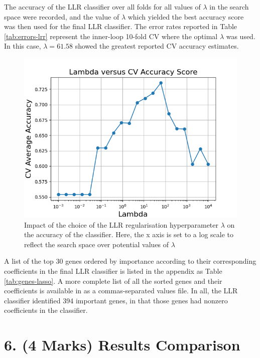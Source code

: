 \documentclass[twocolumn]{article}
\begin{document}
The accuracy of the LLR classifier over all folds for all values of $\lambda$ in the search space were recorded, and the value of $\lambda$ which yielded the best accuracy score was then used for the final LLR classifier. The error rates reported in Table \ref{tab:errors-lrr} represent the inner-loop 10-fold CV where the optimal $\lambda$ was used. In this case, $\lambda=61.58$ showed the greatest reported CV accuracy estimates.

\begin{figure}[H]
    \centering
    \includegraphics[width=\linewidth]{figures/Lambda_versus_CV_Accuracy_Score.png}
    \caption{Impact of the choice of the LLR regularisation hyperparameter $\lambda$ on the accuracy of the classifier. Here, the x axis is set to a log scale to reflect the search space over potential values of $\lambda$}
    \label{fig:lambda-search}
\end{figure}

A list of the top 30 genes ordered by importance according to their corresponding coefficients in the final LLR classifier is listed in the appendix as Table \ref{tab:genes-lasso}. A more complete list of all the sorted genes and their coefficients is available in  as a commas-separated values file. In all, the LLR classifier identified 394 important genes, in that those genes had nonzero coefficients in the classifier.

\section{6. (4 Marks) Results Comparison}
\end{document}
